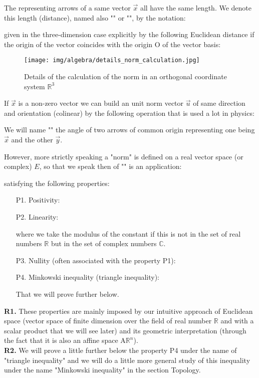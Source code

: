 	The representing arrows of a same vector $\vec{x}$ all have the same length. We denote this length (distance), named also "\label{vector norm}" or "", by the notation:
	
	given in the three-dimension case explicitly by the following Euclidean distance\label{euclidean distance vector} if the origin of the vector coincides with the origin O of the vector basis:
	
	\begin{figure}[H]
		\centering
		\texttt{[image: img/algebra/details\_norm\_calculation.jpg]}
		\caption{Details of the calculation of the norm in an orthogonal coordinate system $\mathbb{R}^3$}
	\end{figure}
	If $\vec{x}$ is a non-zero vector we can build an unit norm vector $\vec{u}$ of same direction and orientation (colinear) by the following operation that is used a lot in physics:
	
	We will name "" the angle of two arrows of common origin representing one being $\vec{x}$ and the other $\vec{y}$.
	
	However, more strictly speaking a "norm" is defined on a real vector space (or complex) $E$, so that we speak then of "" is an application:
	
	satisfying the following properties:
	\begin{enumerate}
		\item[P1.] Positivity:
		
		\item[P2.] Linearity:
		
		where we take the modulus of the constant if this is not in the set of real numbers $\mathbb{R}$ but in the set of complex numbers $\mathbb{C}$.
		\item[P3.] Nullity (often associated with the property P1):
		
		\item[P4.] Minkowski inequality (triangle inequality):
		
		That we will prove further below.
	\end{enumerate}
	\begin{tcolorbox}[title=Remarks,colframe=black,arc=10pt]
	\textbf{R1.} These properties are mainly imposed by our intuitive approach of Euclidean space (vector space of finite dimension over the field of real number $\mathbb{R}$ and with a scalar product that we will see later) and its geometric interpretation (through the fact that it is also an affine space $\text{A}\mathbb{R}^n$).\\
	
	\textbf{R2.} We will prove a little further below the property P4 under the name of "triangle inequality" and we will do a little more general study of this inequality under the name "Minkowski inequality" in the section Topology.
	\end{tcolorbox}	
	
